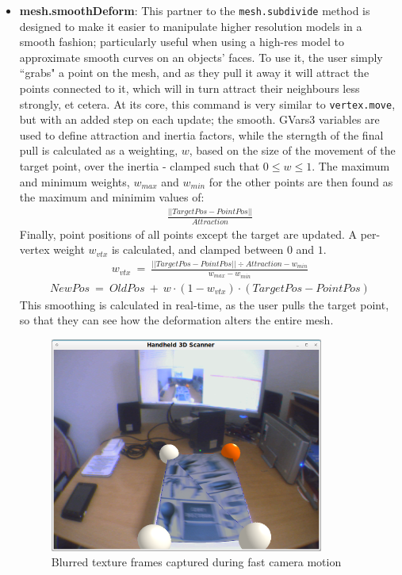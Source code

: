 \documentclass[a4paper,10pt]{article}
\begin{document}
\begin{itemize}
\item{\textbf{mesh.smoothDeform}: This partner to the \texttt{mesh.subdivide} method is designed to make it easier to manipulate higher resolution models in a smooth fashion; particularly useful when using a high-res model to approximate smooth curves on an objects' faces. To use it, the user simply ``grabs" a point on the mesh, and as they pull it away it will attract the points connected to it, which will in turn attract their neighbours less strongly, et cetera. At its core, this command is very similar to \texttt{vertex.move}, but with an added step on each update; the smooth. GVars3 variables are used to define attraction and inertia factors, while the sterngth of the final pull is calculated as a weighting, $w$, based on the size of the movement of the target point, over the inertia - clamped such that $0 \leq w \leq 1$. The maximum and minimum weights, $w_{max}$ and $w_{min}$ for the other points are then found as the maximum and minimim values of:
\begin{eqnarray*}
 \frac{||TargetPos - PointPos||}{Attraction}
\end{eqnarray*}
Finally, point positions of all points except the target are updated. A per-vertex weight $w_{vtx}$ is calculated, and clamped between $0$ and $1$.
\begin{eqnarray*}
w_{vtx} ~=~ \frac{||TargetPos - PointPos|| \div Attraction - w_{min}}{w_{max} - w_{min}}
\end{eqnarray*}
\begin{eqnarray*}
NewPos ~=~ OldPos ~+~ w \cdot (1 - w_{vtx}) \cdot (TargetPos - PointPos)
\end{eqnarray*}
This smoothing is calculated in real-time, as the user pulls the target point, so that they can see how the deformation alters the entire mesh.
}

\begin{figure}
  \begin{center}
    \includegraphics[width=340px]{TextureBlur}
  \end{center}
  \caption{Blurred texture frames captured during fast camera motion}
  \label{camblur}
\end{figure}


\end{itemize}
\end{document}
